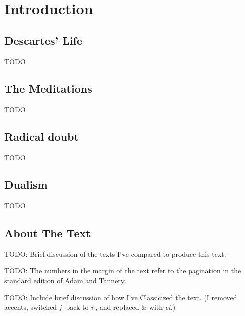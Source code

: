 \chapter*{Introduction}

\section*{Descartes' Life}

TODO

\section*{The Meditations}

TODO

\section*{Radical doubt}

TODO

\section*{Dualism}

TODO

\section*{About The Text}

TODO: Brief discussion of the texts I've compared to produce this text.

TODO: The numbers in the margin of the text refer to the pagination in the standard edition of Adam and Tannery.

TODO: Include brief discussion of how I've Classicized the text. (I removed accents, switched \textit{j}- back to \textit{i}-, and replaced \& with \textit{et}.)

